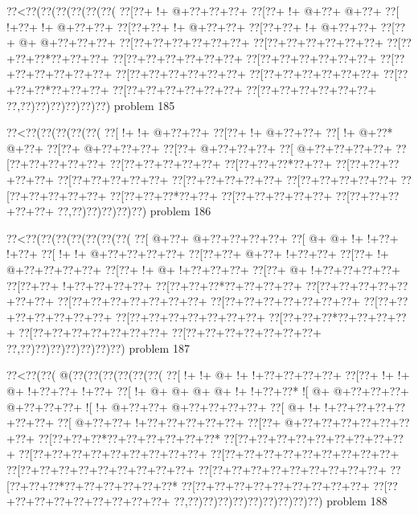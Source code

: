 \vbox{\vbox{\goo
\0??<\0??(\0??(\0??(\0??(\0??(\0??(
\0??[\0??+\- !+\- @+\0??+\0??+\0??+
\0??[\0??+\- !+\- @+\0??+\- @+\0??+
\0??[\- !+\0??+\- !+\- @+\0??+\0??+
\0??[\0??+\0??+\- !+\- @+\0??+\0??+
\0??[\0??+\0??+\- !+\- @+\0??+\0??+
\0??[\0??+\- @+\- @+\0??+\0??+\0??+
\0??[\0??+\0??+\0??+\0??+\0??+\0??+
\0??[\0??+\0??+\0??+\0??+\0??+\0??+
\0??[\0??+\0??+\0??*\0??+\0??+\0??+
\0??[\0??+\0??+\0??+\0??+\0??+\0??+
\0??[\0??+\0??+\0??+\0??+\0??+\0??+
\0??[\0??+\0??+\0??+\0??+\0??+\0??+
\0??[\0??+\0??+\0??+\0??+\0??+\0??+
\0??[\0??+\0??+\0??+\0??+\0??+\0??+
\0??[\0??+\0??+\0??*\0??+\0??+\0??+
\0??[\0??+\0??+\0??+\0??+\0??+\0??+
\0??[\0??+\0??+\0??+\0??+\0??+\0??+
\0??,\0??)\0??)\0??)\0??)\0??)\0??)
}
\hfil problem 185\hfil\break
}

\vbox{\vbox{\goo
\0??<\0??(\0??(\0??(\0??(\0??(
\0??[\- !+\- !+\- @+\0??+\0??+
\0??[\0??+\- !+\- @+\0??+\0??+
\0??[\- !+\- @+\0??*\- @+\0??+
\0??[\0??+\- @+\0??+\0??+\0??+
\0??[\0??+\- @+\0??+\0??+\0??+
\0??[\- @+\0??+\0??+\0??+\0??+
\0??[\0??+\0??+\0??+\0??+\0??+
\0??[\0??+\0??+\0??+\0??+\0??+
\0??[\0??+\0??+\0??*\0??+\0??+
\0??[\0??+\0??+\0??+\0??+\0??+
\0??[\0??+\0??+\0??+\0??+\0??+
\0??[\0??+\0??+\0??+\0??+\0??+
\0??[\0??+\0??+\0??+\0??+\0??+
\0??[\0??+\0??+\0??+\0??+\0??+
\0??[\0??+\0??+\0??*\0??+\0??+
\0??[\0??+\0??+\0??+\0??+\0??+
\0??[\0??+\0??+\0??+\0??+\0??+
\0??,\0??)\0??)\0??)\0??)\0??)
}
\hfil problem 186\hfil\break
}

\vbox{\vbox{\goo
\0??<\0??(\0??(\0??(\0??(\0??(\0??(\0??(
\0??[\- @+\0??+\- @+\0??+\0??+\0??+\0??+
\0??[\- @+\- @+\- !+\- !+\0??+\- !+\0??+
\0??[\- !+\- !+\- @+\0??+\0??+\0??+\0??+
\0??[\0??+\0??+\- @+\0??+\- !+\0??+\0??+
\0??[\0??+\- !+\- @+\0??+\0??+\0??+\0??+
\0??[\0??+\- !+\- @+\- !+\0??+\0??+\0??+
\0??[\0??+\- @+\- !+\0??+\0??+\0??+\0??+
\0??[\0??+\0??+\- !+\0??+\0??+\0??+\0??+
\0??[\0??+\0??+\0??*\0??+\0??+\0??+\0??+
\0??[\0??+\0??+\0??+\0??+\0??+\0??+\0??+
\0??[\0??+\0??+\0??+\0??+\0??+\0??+\0??+
\0??[\0??+\0??+\0??+\0??+\0??+\0??+\0??+
\0??[\0??+\0??+\0??+\0??+\0??+\0??+\0??+
\0??[\0??+\0??+\0??+\0??+\0??+\0??+\0??+
\0??[\0??+\0??+\0??*\0??+\0??+\0??+\0??+
\0??[\0??+\0??+\0??+\0??+\0??+\0??+\0??+
\0??[\0??+\0??+\0??+\0??+\0??+\0??+\0??+
\0??,\0??)\0??)\0??)\0??)\0??)\0??)\0??)
}
\hfil problem 187\hfil\break
}

\vbox{\vbox{\goo
\0??<\0??(\0??(\- @(\0??(\0??(\0??(\0??(\0??(\0??(
\0??[\- !+\- !+\- @+\- !+\- !+\0??+\0??+\0??+\0??+
\0??[\0??+\- !+\- !+\- @+\- !+\0??+\0??+\- !+\0??+
\0??[\- !+\- @+\- @+\- @+\- @+\- !+\- !+\0??+\0??*
\- ![\- @+\- @+\0??+\0??+\0??+\- @+\0??+\0??+\0??+
\- ![\- !+\- @+\0??+\0??+\- @+\0??+\0??+\0??+\0??+
\0??[\- @+\- !+\- !+\0??+\0??+\0??+\0??+\0??+\0??+
\0??[\- @+\0??+\0??+\- !+\0??+\0??+\0??+\0??+\0??+
\0??[\0??+\- @+\0??+\0??+\0??+\0??+\0??+\0??+\0??+
\0??[\0??+\0??+\0??*\0??+\0??+\0??+\0??+\0??+\0??*
\0??[\0??+\0??+\0??+\0??+\0??+\0??+\0??+\0??+\0??+
\0??[\0??+\0??+\0??+\0??+\0??+\0??+\0??+\0??+\0??+
\0??[\0??+\0??+\0??+\0??+\0??+\0??+\0??+\0??+\0??+
\0??[\0??+\0??+\0??+\0??+\0??+\0??+\0??+\0??+\0??+
\0??[\0??+\0??+\0??+\0??+\0??+\0??+\0??+\0??+\0??+
\0??[\0??+\0??+\0??*\0??+\0??+\0??+\0??+\0??+\0??*
\0??[\0??+\0??+\0??+\0??+\0??+\0??+\0??+\0??+\0??+
\0??[\0??+\0??+\0??+\0??+\0??+\0??+\0??+\0??+\0??+
\0??,\0??)\0??)\0??)\0??)\0??)\0??)\0??)\0??)\0??)
}
\hfil problem 188\hfil\break
}

